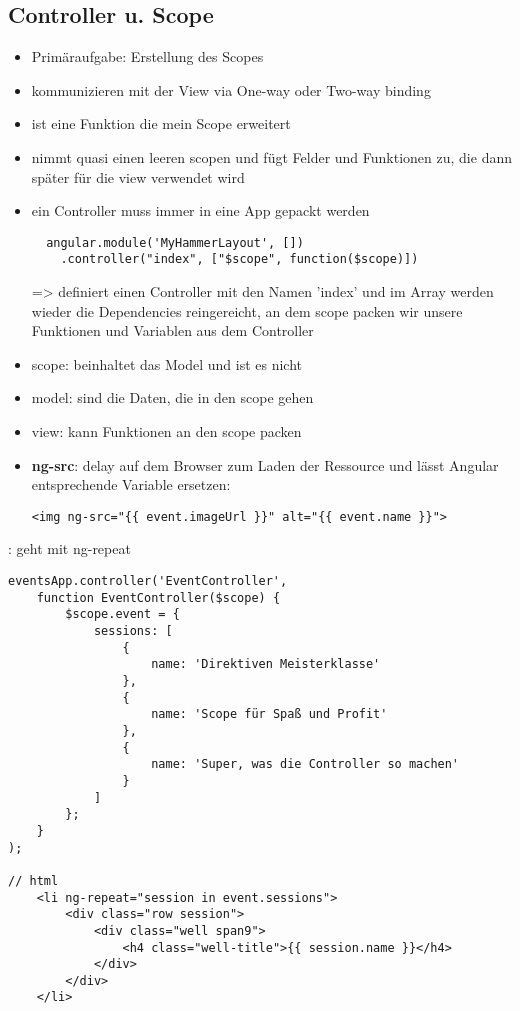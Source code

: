 \subsection{Controller u. Scope}
\begin{itemize}
  \item Primäraufgabe: Erstellung des Scopes
  \item kommunizieren mit der View via One-way oder Two-way binding
  \item ist eine Funktion die mein Scope erweitert
  \item nimmt quasi einen leeren scopen und fügt Felder und Funktionen zu, die dann später für die view verwendet wird
  \item ein Controller muss immer in eine App gepackt werden
    \begin{verbatim}
  angular.module('MyHammerLayout', [])
    .controller("index", ["$scope", function($scope)])
    \end{verbatim}
    => definiert einen Controller mit den Namen 'index' und im Array
    werden wieder die Dependencies reingereicht, an dem scope packen wir unsere Funktionen und Variablen aus dem
    Controller
  \item scope: beinhaltet das Model und ist es nicht
  \item model: sind die Daten, die in den scope gehen
  \item view: kann Funktionen an den scope packen
  \item \textbf{ng-src}: delay auf dem Browser zum Laden der Ressource und lässt Angular
    entsprechende Variable ersetzen:
    \begin{verbatim}
<img ng-src="{{ event.imageUrl }}" alt="{{ event.name }}">
    \end{verbatim}
\end{itemize}


: geht mit ng-repeat


\begin{verbatim}
eventsApp.controller('EventController',
    function EventController($scope) {
        $scope.event = {
            sessions: [
                {
                    name: 'Direktiven Meisterklasse'
                },
                {
                    name: 'Scope für Spaß und Profit'
                },
                {
                    name: 'Super, was die Controller so machen'
                }
            ]
        };
    }
);

// html
	<li ng-repeat="session in event.sessions">
		<div class="row session">
			<div class="well span9">
				<h4 class="well-title">{{ session.name }}</h4>
			</div>
		</div>
	</li>
\end{verbatim}


